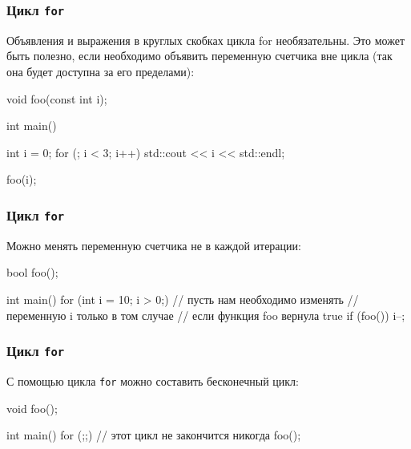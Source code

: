 \documentclass[compress, 8pt, aspectratio=169]{beamer}
\begin{document}
\begin{frame}[fragile]

    \frametitle{Цикл \texttt{for}}

    Объявления и выражения в круглых скобках цикла for необязательны.
    Это может быть полезно, если необходимо объявить переменную счетчика
    вне цикла (так она будет доступна за его пределами):

    \begin{myinplacelisting}[minted language=cpp]
void foo(const int i);

int main() {
    int i = 0;
    for (; i < 3; i++) {
        std::cout << i << std::endl;
    }

    foo(i);
}
    \end{myinplacelisting}

\end{frame}

\begin{frame}[fragile]

    \frametitle{Цикл \texttt{for}}

    Можно менять переменную счетчика не в каждой итерации:

    \begin{myinplacelisting}[minted language=cpp]
bool foo();

int main() {
    for (int i = 10; i > 0;) {
        // пусть нам необходимо изменять
        // переменную i только в том случае
        // если функция foo вернула true
        if (foo()) {
            i--;
        }
    }
}
    \end{myinplacelisting}

\end{frame}

\begin{frame}[fragile]

    \frametitle{Цикл \texttt{for}}

    С помощью цикла \verb|for| можно составить бесконечный
    цикл\footnotemark{}:


    \begin{myinplacelisting}[minted language=cpp]
void foo();

int main() {
    for (;;) {
        // этот цикл не закончится никогда
        foo();
    }
}
    \end{myinplacelisting}

\end{frame}
\end{document}
